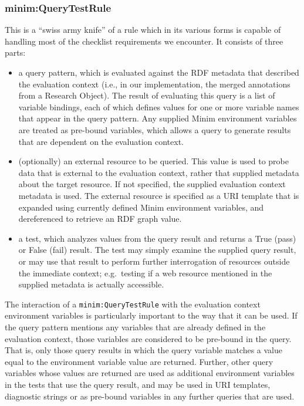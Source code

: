 \documentclass[]{article}
\begin{document}
\subsubsection{minim:QueryTestRule}

This is a ``swiss army knife'' of a rule which in its various forms is
capable of handling most of the checklist requirements we encounter. It
consists of three parts:

\begin{itemize}
\itemsep1pt\parskip0pt
\item
  a query pattern, which is evaluated against the RDF metadata that
  described the evaluation context (i.e., in our implementation, the
  merged annotations from a Research Object). The result of evaluating
  this query is a list of variable bindings, each of which defines
  values for one or more variable names that appear in the query
  pattern. Any supplied Minim environment variables are treated as
  pre-bound variables, which allows a query to generate results that are
  dependent on the evaluation context.
\item
  (optionally) an external resource to be queried. This value is used to
  probe data that is external to the evaluation context, rather that
  supplied metadata about the target resource. If not specified, the
  supplied evaluation context metadata is used. The external resource is
  specified as a URI template that is expanded using currently defined
  Minim environment variables, and dereferenced to retrieve an RDF graph
  value.
\item
  a test, which analyzes values from the query result and returns a True
  (pass) or False (fail) result. The test may simply examine the
  supplied query result, or may use that result to perform further
  interrogation of resources outside the immediate context; e.g.~testing
  if a web resource mentioned in the supplied metadata is actually
  accessible.
\end{itemize}

The interaction of a \texttt{minim:QueryTestRule} with the evaluation
context environment variables is particularly important to the way that
it can be used. If the query pattern mentions any variables that are
already defined in the evaluation context, those variables are
considered to be pre-bound in the query. That is, only those query
results in which the query variable matches a value equal to the
environment variable value are returned. Further, other query variables
whose values are returned are used as additional environment variables
in the tests that use the query result, and may be used in URI
templates, diagnostic strings or as pre-bound variables in any further
queries that are used.
\end{document}
